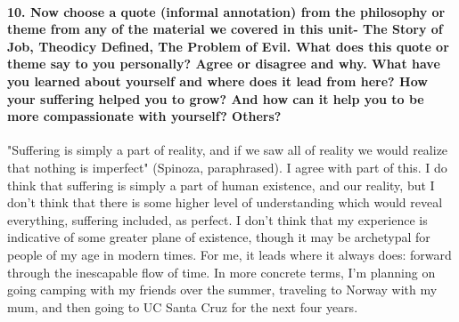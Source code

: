 \documentclass[12pt]{article}
\begin{document}
	\paragraph{10. Now choose a quote (informal annotation) from the philosophy or theme from any of the material we covered in this unit- The Story of Job, Theodicy Defined, The Problem of Evil. What does this quote or theme say to you personally? Agree or disagree and why. What have you learned about yourself and where does it lead from here? How your suffering helped you to grow? And how can it help you to be more compassionate with yourself? Others?}
	"Suffering is simply a part of reality, and if we saw all of reality we would realize that nothing is imperfect" (Spinoza, paraphrased). I agree with part of this. I do think that suffering is simply a part of human existence, and our reality, but I don't think that there is some higher level of understanding which would reveal everything, suffering included, as perfect. I don't think that my experience is indicative of some greater plane of existence, though it may be archetypal for people of my age in modern times. For me, it leads where it always does: forward through the inescapable flow of time. In more concrete terms, I'm planning on going camping with my friends over the summer, traveling to Norway with my mum, and then going to UC Santa Cruz for the next four years.
\end{document}
